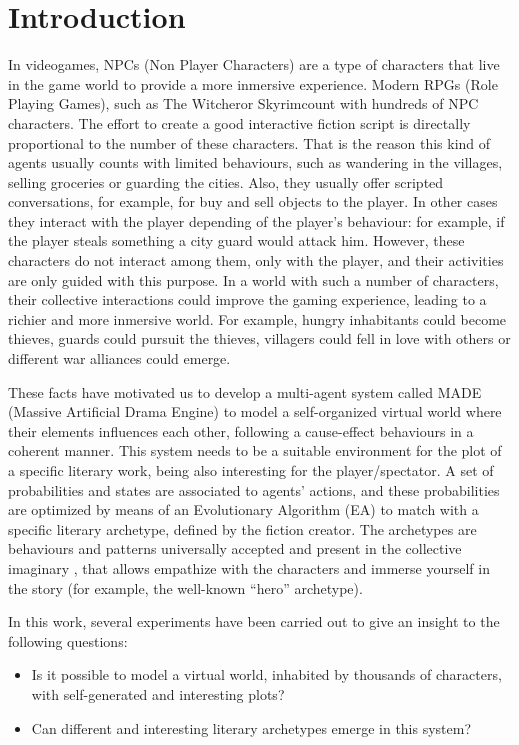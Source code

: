 \documentclass[final,1p,times]{elsarticle}
\begin{document}
\section{Introduction}
\label{sec:intro}


In videogames, NPCs (Non Player Characters) are a type of characters that live in the game world to provide a more inmersive experience. Modern RPGs (Role Playing Games), such as The Witcher\texttrademark or Skyrim\texttrademark count with hundreds of NPC characters. The effort to create a good interactive fiction script is directally proportional to the number of these characters. That is the reason this kind of agents usually counts with limited behaviours, such as wandering in the villages, selling groceries or guarding the cities. Also, they usually offer scripted conversations, for example, for buy and sell objects to the player. In other cases they interact with the player depending of the player's behaviour: for example, if the player steals something a city guard would attack him.  However, these characters do not interact among them, only with the player, and their activities are only guided with this purpose. In a world with such a number of characters, their collective interactions could improve the gaming experience, leading to a richier and more inmersive world. For example, hungry inhabitants could become thieves, guards could pursuit the thieves, villagers could fell in love with others or different war alliances could emerge.

These facts have motivated us to develop a multi-agent system called MADE (Massive Artificial Drama Engine) to model a self-organized virtual world where their elements influences each other, following a cause-effect behaviours in a coherent manner. This system needs to be a suitable environment for the plot of a specific literary work, being also interesting for the player/spectator. A set of probabilities and states are associated to agents' actions, and these probabilities are optimized by means of an Evolutionary Algorithm (EA) to match with a specific literary archetype, defined by the fiction creator. The archetypes are behaviours and patterns universally accepted and present in the collective imaginary \cite{ArchetypesGarry05}, that allows empathize with the characters and immerse yourself in the story (for example, the well-known ``hero'' archetype).

In this work, several experiments have been carried out to give an
insight to the following questions: %
\begin{itemize}
 \item Is it possible to model a virtual world, inhabited by thousands of characters, with self-generated and interesting plots?
 \item Can different and interesting literary archetypes emerge in this system?
\end{itemize}
\end{document}
